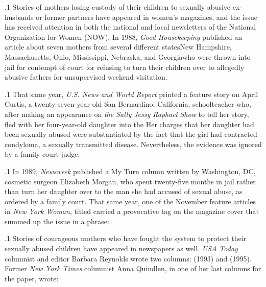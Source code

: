 \documentclass[11pt, twoside]{article}
\begin{document}
{\p.1{%
\:Stories of mothers losing custody of their children to sexually abusive
ex-husbands or former partners have appeared in women’s magazines,
and the issue has received attention in both the national and local
newsletters of the National Organization for Women (NOW). In 1988,
\textit{Good Housekeeping} published an article about seven mothers from
several different states\mdash{}New Hampshire, Massachusetts, Ohio, Mississippi, Nebraska, and Georgia\mdash{}who were thrown into jail for contempt
of court for refusing to turn their children over to allegedly abusive
fathers for unsupervised weekend visitation.\;
}%

\p.1{%
\:That same year, \textit{U.S. News and World Report} printed a feature story
on April Curtis, a twenty-seven-year-old San Bernardino, California, schoolteacher who, after making an appearance on \textit{the Sally Jessy
Raph\-ael Show} to tell her story, fled with her four-year-old daughter
into the  Her charges that her daughter had
been sexually abused were substantiated by the fact that the girl had
contracted condyloma, a sexually transmitted disease. Nevertheless, the
evidence was ignored by a family court judge.\;
}%

\p.1{%
\:In 1989, \textit{Newsweek} published a My Turn column written by Washington, DC, cosmetic surgeon Elizabeth Morgan, who spent twenty-five
months in jail rather than turn her daughter over to the man
she had accused of sexual abuse, as ordered by a family court. That
same year, one of the November feature articles in \textit{New York Woman},
titled  carried a provocative tag on the magazine cover that summed up the issue in a phrase: \;
}%

\p.1{%
\:Stories of courageous mothers who have fought the system to protect their sexually abused children have appeared in newspapers as well.
\textit{USA Today} columnist and editor Barbara Reynolds wrote two columns:
 (1993) and  (1995). Former \textit{New York Times} columnist
Anna Quindlen, in one of her last columns for the paper, wrote: \;
}%

}
\end{document}
